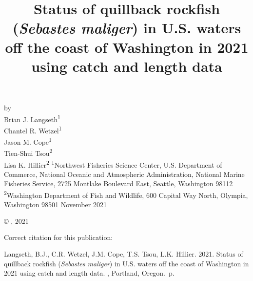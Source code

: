 \documentclass[11pt,
  english,
  letterpaper,
]{article}
\date{}
\newcommand{\trTitle}{Status of quillback rockfish (\emph{Sebastes maliger}) in U.S. waters off the coast of Washington in 2021 using catch and length data}
\newcommand{\trYear}{2021}
\newcommand{\trMonth}{November}
\newcommand{\trAuthsBack}{Langseth, B.J., C.R. Wetzel, J.M. Cope, T.S. Tsou, L.K. Hillier}
\newcommand{\trCitation}{
\begin{hangparas}{1em}{1}
\trAuthsBack{}. \trYear{}. \trTitle{}. \glsentrylong{pfmc}, Portland, Oregon. \pageref{LastPage}{}\,p.
\end{hangparas}}
\begin{document}

\renewcommand*{\thefootnote}{\fnsymbol{footnote}}

\small
\thispagestyle{empty}
\noindent
\begin{center}
\title{Status of quillback rockfish (\emph{Sebastes maliger}) in U.S. waters off the coast of Washington in 2021 using catch and length data}
\vspace{1.5cm}
{\Large\textbf{}}
\vfill
by\\
Brian J. Langseth\textsuperscript{1}\\
Chantel R. Wetzel\textsuperscript{1}\\
Jason M. Cope\textsuperscript{1}\\
Tien-Shui Tsou\textsuperscript{2}\\
Lisa K. Hillier\textsuperscript{2}\vfill
\textsuperscript{1}Northwest Fisheries Science Center, U.S. Department of Commerce, National Oceanic and Atmospheric Administration, National Marine Fisheries Service, 2725 Montlake Boulevard East, Seattle, Washington 98112\\
\textsuperscript{2}Washington Department of Fish and Wildlife, 600 Capital Way North, Olympia, Washington 98501\vfill
\trMonth{} \trYear{}
\end{center}
\clearpage

\thispagestyle{empty}
\vspace*{\fill}
\begin{center}
\copyright{} , \trYear{}\\
\end{center}
\par
\bigskip
\noindent
Correct citation for this publication:
\bigskip
\par
\trCitation{}
\clearpage


\tableofcontents\clearpage
\label{TRlastRoman}
\clearpage

\newpage
\thispagestyle{empty} %

\pagestyle{plain}  %
\renewcommand*{\thefootnote}{\arabic{footnote}}  %
\setcounter{footnote}{0}  %
\renewcommand{\headrulewidth}{0.5pt}
\renewcommand{\footrulewidth}{0.5pt}
\end{document}
